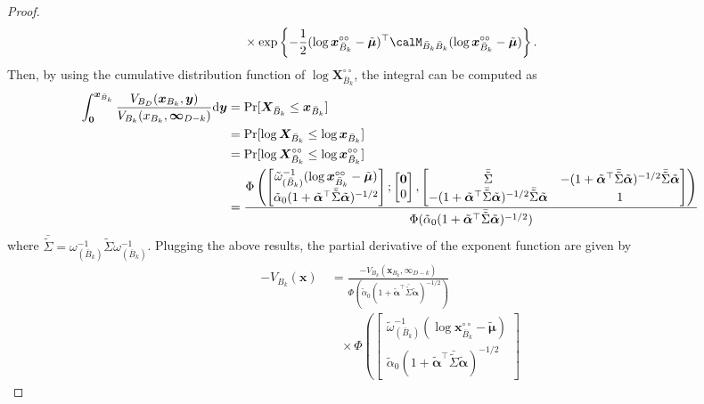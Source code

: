 \documentclass[12pt]{article}
\begin{document}
\begin{proof}
\begin{align*}
&\quad \times \exp\left\{-\frac{1}{2} (\log \bm x_{\bar B_k}^{\circ\circ}-\tilde{\bm\mu})^\top \calM_{\bar B_k \bar B_k} (\log \bm x_{\bar B_k}^{\circ\circ}-\tilde{\bm\mu})\right\}. 
\end{align*}
Then, by using the cumulative distribution function of $\log\bm X_{\bar B_k}^{\circ\circ}$, the integral can be computed as
\begin{align*}
   \int_{\bm 0}^{\bm x_{\bar B_k}}\frac{V_{B_D}(\bm x_{B_k},\bm y)}{V_{B_k}(x_{B_k},\bm\infty_{D-k})} \text d \bm y 
   &= \Pr[\bm X_{\bar B_k} \leq \bm x_{\bar B_k}] \\
& = \Pr[\log\bm X_{\bar B_k} \leq \log\bm x_{\bar B_k}]\\
& = \Pr[\log\bm X_{\bar B_k}^{\circ\circ} \leq \log\bm x_{\bar B_k}^{\circ\circ}] \\
& =  \frac{\Phi\left(
\begin{bmatrix} \tilde\omega^{-1}_{(\bar B_k)}(\log \bm x_{\bar B_k}^{\circ\circ} - \tilde{\bm\mu})  \\\tilde\alpha_0(1+\tilde{\bm\alpha}^\top\bar{\tilde\Sigma}\tilde{\bm\alpha})^{-1/2}
\end{bmatrix};
\begin{bmatrix}
\bm 0 \\ 0
\end{bmatrix},
\begin{bmatrix}
	\bar{\tilde\Sigma} & -(1+\tilde{\bm\alpha}^\top\bar{\tilde\Sigma}\tilde{\bm\alpha})^{-1/2}\bar{\tilde\Sigma}\tilde{\bm\alpha} \\
-(1+\tilde{\bm\alpha}^\top\bar{\tilde\Sigma}\tilde{\bm\alpha})^{-1/2}\bar{\tilde\Sigma}\tilde{\bm\alpha} &	1
\end{bmatrix} 
\right)}{\Phi(\tilde\alpha_0(1+\tilde{\bm\alpha}^\top\bar{\tilde\Sigma}\tilde{\bm\alpha})^{-1/2})}   
\end{align*}
where $\bar{\tilde\Sigma} = \omega_{(\bar B_k)}^{-1}\tilde\Sigma\omega_{(\bar B_k)}^{-1}$. 
Plugging the above results, the partial derivative of the exponent function are given by
\begin{align*}
   -V_{B_k}(\bm x) &\ =  
   \frac{-V_{B_k}(\bm x_{B_k},\bm \infty_{D-k})}{\Phi(\tilde\alpha_0(1+\tilde{\bm\alpha}^\top\bar{\tilde\Sigma}\tilde{\bm\alpha})^{-1/2})} \\
   & \quad \times
   \Phi\left(
   \begin{bmatrix} \tilde\omega^{-1}_{(\bar B_k)}(\log \bm x_{\bar B_k}^{\circ\circ} - \tilde{\bm\mu})  \\
\tilde\alpha_0(1+\tilde{\bm\alpha}^\top\bar{\tilde\Sigma}\tilde{\bm\alpha})^{-1/2}

\end{bmatrix}
\end{align*}
\end{proof}
\end{document}
